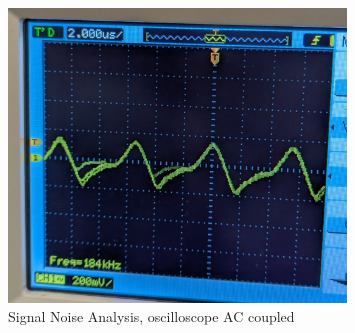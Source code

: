 \begin{figure} 
    \centering
    \includegraphics[width=0.8\textwidth]{chapters/methodology/ArduinoDAQ/signal_noise.png}
    \caption{Signal Noise Analysis, oscilloscope AC coupled}
    \label{fig:sigNoise}
\end{figure}